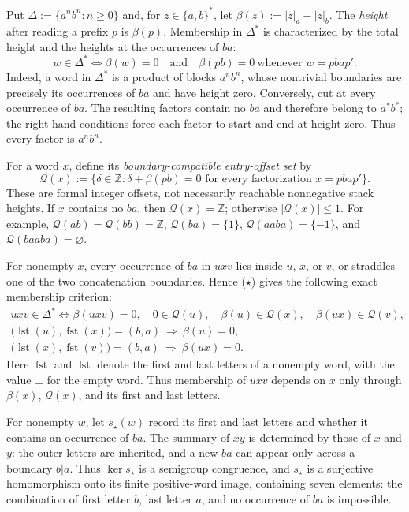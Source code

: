 \documentclass[11pt,a4paper]{article}
\theoremstyle{remark}
\theoremstyle{plain}
\begin{document}
Put $\Delta:=\{a^nb^n:n\ge0\}$ and, for
$z\in\{a,b\}^*$, let $\beta(z):=|z|_a-|z|_b$.
The \emph{height} after reading a prefix $p$ is $\beta(p)$.
Membership in $\Delta^*$ is characterized by the total
height and the heights at the occurrences of $ba$:
\begin{equation}\tag{$\star$}
w\in\Delta^*
\iff \beta(w)=0\quad\text{and}\quad
\beta(pb)=0\ \text{whenever }w=pba p'.
\end{equation}
Indeed, a word in $\Delta^*$ is a product of blocks
$a^nb^n$, whose nontrivial boundaries are precisely its
occurrences of $ba$ and have height zero.
Conversely, cut at every occurrence of $ba$. The resulting
factors contain no $ba$ and therefore belong to $a^*b^*$;
the right-hand conditions force each factor to start and
end at height zero. Thus every factor is $a^nb^n$.

For a word $x$, define its \emph{boundary-compatible
entry-offset set} by
\[
\mathcal Q(x):=
\{\delta\in\mathbb Z:
 \delta+\beta(pb)=0\text{ for every factorization }x=pba p'\}.
\]
These are formal integer offsets, not necessarily reachable
nonnegative stack heights. If $x$ contains no $ba$, then
$\mathcal Q(x)=\mathbb Z$; otherwise
$|\mathcal Q(x)|\le1$. For example,
$\mathcal Q(ab)=\mathcal Q(bb)=\mathbb Z$,
$\mathcal Q(ba)=\{1\}$,
$\mathcal Q(aaba)=\{-1\}$, and
$\mathcal Q(baaba)=\varnothing$.

For nonempty $x$, every occurrence of $ba$ in $uxv$
lies inside $u$, $x$, or $v$, or straddles one of the
two concatenation boundaries. Hence \textup{($\star$)}
gives the following exact membership criterion:
\begin{equation}\tag{$\star\star$}
\begin{gathered}
uxv\in\Delta^*
\iff
\beta(uxv)=0,\quad
0\in\mathcal Q(u),\quad
\beta(u)\in\mathcal Q(x),\quad
\beta(ux)\in\mathcal Q(v),\\
\bigl(\operatorname{lst}(u),\operatorname{fst}(x)\bigr)=(b,a)
\ \Longrightarrow\ \beta(u)=0,\\
\bigl(\operatorname{lst}(x),\operatorname{fst}(v)\bigr)=(b,a)
\ \Longrightarrow\ \beta(ux)=0.
\end{gathered}
\end{equation}
Here $\operatorname{fst}$ and $\operatorname{lst}$ denote the
first and last letters of a nonempty word, with the value
$\bot$ for the empty word. Thus membership of $uxv$
depends on $x$ only through $\beta(x)$,
$\mathcal Q(x)$, and its first and last letters.

For nonempty $w$, let $s_\star(w)$ record its first and
last letters and whether it contains an occurrence of $ba$.
The summary of $xy$ is determined by those of $x$ and $y$:
the outer letters are inherited, and a new $ba$ can appear
only across a boundary $b|a$. Thus $\ker s_\star$ is a
semigroup congruence, and $s_\star$ is a surjective
homomorphism onto its finite positive-word image,
containing seven elements: the combination of first letter $b$,
last letter $a$, and no occurrence of $ba$ is impossible.
\end{document}
